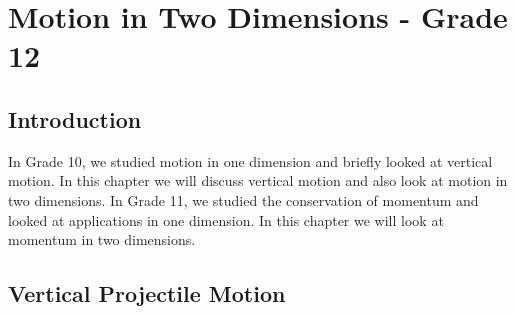 
\chapter{Motion in Two Dimensions - Grade 12}
\label{p:m:m2d12}

\section{Introduction}
In Grade 10, we studied motion in one dimension and briefly looked at vertical motion. In this chapter we will discuss vertical motion and also look at motion in two dimensions. In Grade 11, we studied the conservation of momentum and looked at applications in one dimension. In this chapter we will look at momentum in two dimensions.

\section{Vertical Projectile Motion}
